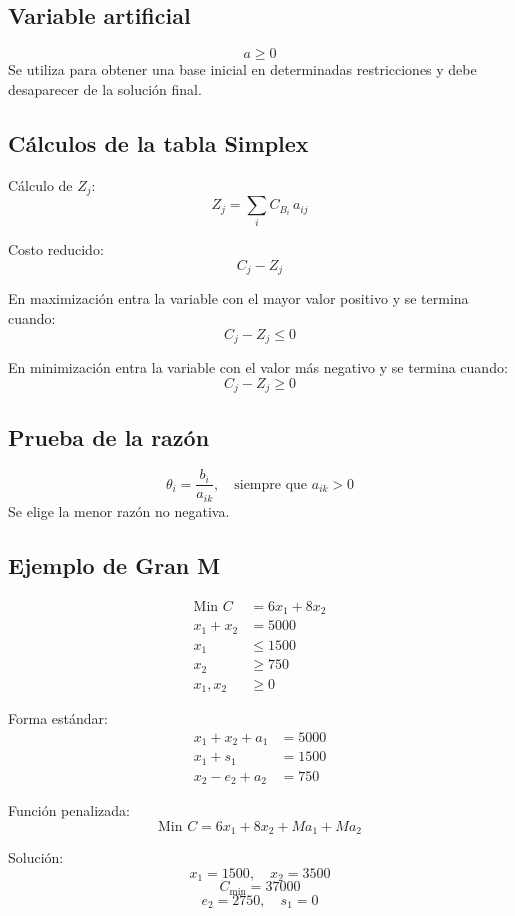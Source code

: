 \documentclass[12pt,letterpaper]{article}
\begin{document}
\subsection*{Variable artificial}
\[ a \geq 0 \]
Se utiliza para obtener una base inicial en determinadas restricciones y debe desaparecer de la solución final.

\subsection*{Cálculos de la tabla Simplex}

Cálculo de $Z_j$:
\[ Z_j = \sum_i C_{B_i}\, a_{ij} \]

Costo reducido:
\[ C_j - Z_j \]

En maximización entra la variable con el mayor valor positivo y se termina cuando:
\[ C_j - Z_j \leq 0 \]

En minimización entra la variable con el valor más negativo y se termina cuando:
\[ C_j - Z_j \geq 0 \]

\subsection*{Prueba de la razón}
\[ \theta_i = \frac{b_i}{a_{ik}}, \quad \text{siempre que } a_{ik} > 0 \]
Se elige la menor razón no negativa.

\subsection*{Ejemplo de Gran M}

\[
\begin{aligned}
\text{Min } C &= 6x_1 + 8x_2\\
x_1 + x_2 &= 5000\\
x_1 &\leq 1500\\
x_2 &\geq 750\\
x_1, x_2 &\geq 0
\end{aligned}
\]

Forma estándar:
\[
\begin{aligned}
x_1 + x_2 + a_1 &= 5000\\
x_1 + s_1 &= 1500\\
x_2 - e_2 + a_2 &= 750
\end{aligned}
\]

Función penalizada:
\[ \text{Min } C = 6x_1 + 8x_2 + M a_1 + M a_2 \]

Solución:
\[ x_1 = 1500, \quad x_2 = 3500 \]
\[ C_{\min} = 37000 \]
\[ e_2 = 2750, \quad s_1 = 0 \]
\end{document}
